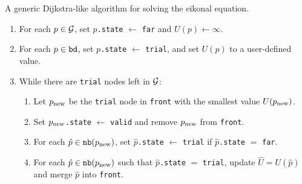 \documentclass[smallcondensed]{svjour3}
\begin{document}
\begin{algorithm}
  \caption{A generic Dijkstra-like algorithm for solving the eikonal
    equation.}\label{alg:dijkstra-like}
  \begin{enumerate}[nolistsep]
  \item For each $p \in \mathcal{G}$, set $p$\texttt{.state} $\gets$
    \texttt{far} and $U(p) \gets \infty$.
  \item For each $p \in \texttt{bd}$, set $p$\texttt{.state} $\gets$
    \texttt{trial}, and set $U(p)$ to a user-defined value.
  \item While there are \texttt{trial} nodes left in $\mathcal{G}$:
    \begin{enumerate}[nolistsep]
    \item Let $p_{\operatorname{new}}$ be the \texttt{trial} node in \texttt{front}
      with the smallest value $U(p_{\operatorname{new}})$.\label{enum:get-node}
    \item Set $p_{\operatorname{new}}$\texttt{.state} $\gets$ \texttt{valid} and remove
      $p_{\operatorname{new}}$ from \texttt{front}.
    \item For each $\hat{p} \in \texttt{nb}(p_{\operatorname{new}})$, set
      $\hat{p}$\texttt{.state} $\gets$ \texttt{trial} if
      $\hat{p}$\texttt{.state} $=$ \texttt{far}.\label{enum:set-trial}
    \item For each $\hat{p} \in \texttt{nb}(p_{\operatorname{new}})$ such that
      $\hat{p}$\texttt{.state} $=$ \texttt{trial}, update
      $\hat{U} = U(\hat{p})$ and merge $\hat{p}$ into
      \texttt{front}.\label{enum:update-U}
    \end{enumerate}
  \end{enumerate}
\end{algorithm}
\end{document}

